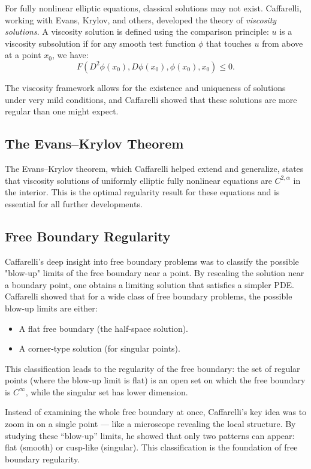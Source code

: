 For fully nonlinear elliptic equations, classical solutions may not exist. Caffarelli, working with Evans, Krylov, and others, developed the theory of \emph{viscosity solutions}. A viscosity solution is defined using the comparison principle: $u$ is a viscosity subsolution if for any smooth test function $\phi$ that touches $u$ from above at a point $x_0$, we have:
\[
F(D^2\phi(x_0), D\phi(x_0), \phi(x_0), x_0) \leq 0.
\]

The viscosity framework allows for the existence and uniqueness of solutions under very mild conditions, and Caffarelli showed that these solutions are more regular than one might expect.

\subsection{The Evans--Krylov Theorem}

The Evans--Krylov theorem, which Caffarelli helped extend and generalize, states that viscosity solutions of uniformly elliptic fully nonlinear equations are $C^{2,\alpha}$ in the interior. This is the optimal regularity result for these equations and is essential for all further developments.

\subsection{Free Boundary Regularity}

Caffarelli's deep insight into free boundary problems was to classify the possible "blow-up" limits of the free boundary near a point. By rescaling the solution near a boundary point, one obtains a limiting solution that satisfies a simpler PDE. Caffarelli showed that for a wide class of free boundary problems, the possible blow-up limits are either:
\begin{itemize}
\item A flat free boundary (the half-space solution).
\item A corner-type solution (for singular points).
\end{itemize}

This classification leads to the regularity of the free boundary: the set of regular points (where the blow-up limit is flat) is an open set on which the free boundary is $C^\infty$, while the singular set has lower dimension.

\begin{bigidea}
Instead of examining the whole free boundary at once, Caffarelli's key idea was to zoom in on a single point --- like a microscope revealing the local structure. By studying these ``blow-up'' limits, he showed that only two patterns can appear: flat (smooth) or cusp-like (singular). This classification is the foundation of free boundary regularity.
\end{bigidea}


